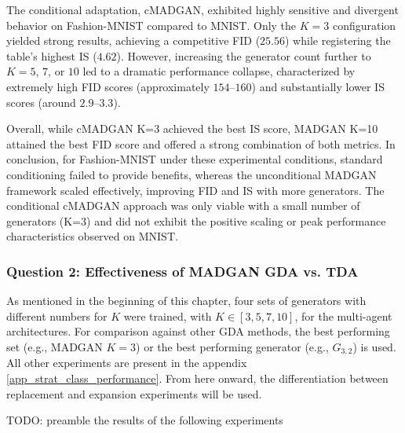 The conditional adaptation, cMADGAN, exhibited highly sensitive and divergent behavior on Fashion-MNIST compared to MNIST. Only the $K = 3$ configuration yielded strong results, achieving a competitive FID ($25.56$) while registering the table's highest IS ($4.62$). However, increasing the generator count further to $K = 5$, $7$, or $10$ led to a dramatic performance collapse, characterized by extremely high FID scores (approximately $154$–$160$) and substantially lower IS scores (around $2.9$–$3.3$).

Overall, while cMADGAN K=3 achieved the best IS score, MADGAN K=10 attained the best FID score and offered a strong combination of both metrics. In conclusion, for Fashion-MNIST under these experimental conditions, standard conditioning failed to provide benefits, whereas the unconditional MADGAN framework scaled effectively, improving FID and IS with more generators. The conditional cMADGAN approach was only viable with a small number of generators (K=3) and did not exhibit the positive scaling or peak performance characteristics observed on MNIST.

\subsubsection[Question 2]{Question 2: Effectiveness of MADGAN GDA vs. TDA}\label{exp_results_ans_q2}
 As mentioned in the beginning of this chapter, four sets of generators with different numbers for \(K\) were trained, with \(K \in [3, 5, 7, 10]\), for the multi-agent architectures. For comparison against other GDA methods, the best performing set (e.g., MADGAN \(K=3\)) or the best performing generator (e.g., \(G_{3,2}\)) is used. All other experiments are present in the appendix \ref{app_strat_class_performance}. From here onward, the differentiation between replacement and expansion experiments will be used.


TODO: preamble the results of the following experiments

